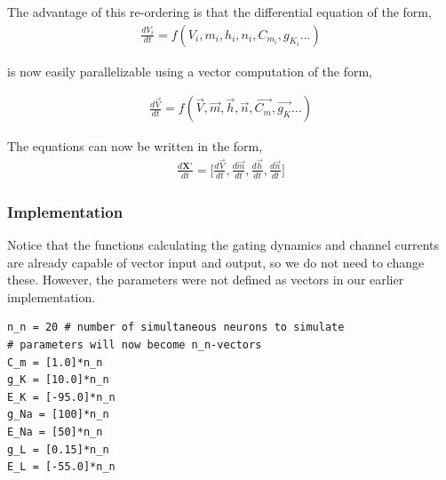\documentclass[10pt,letterpaper]{article}
\begin{document}
\begin{nolinenumbers}
The advantage of this re-ordering is that the differential equation of the form,
\begin{eqnarray}\frac{dV_i}{dt}=f(V_i,m_i,h_i,n_i,C_{m_i},g_{K_i}...)\end{eqnarray}

is now easily parallelizable using a vector computation of the form, 

\begin{eqnarray}\frac{d\vec{V}}{dt}=f(\vec{V},\vec{m},\vec{h},\vec{n},\vec{C_m},\vec{g_K}...)\end{eqnarray}

The equations can now be written in the form,
\begin{eqnarray}\frac{d\mathbf{X'}}{dt}= \Big[\frac{d\vec{V}}{dt},\frac{d\vec{m}}{dt},\frac{d\vec{h}}{dt},\frac{d\vec{n}}{dt}\Big]\end{eqnarray}

\subsubsection*{Implementation}

Notice that the functions calculating the gating dynamics and channel currents are already capable of vector input and output, so we do not need to change these. However, the parameters were not defined as vectors in our earlier implementation.

\begin{verbatim}
n_n = 20 # number of simultaneous neurons to simulate
# parameters will now become n_n-vectors
C_m = [1.0]*n_n
g_K = [10.0]*n_n
E_K = [-95.0]*n_n
g_Na = [100]*n_n
E_Na = [50]*n_n 
g_L = [0.15]*n_n
E_L = [-55.0]*n_n


\end{verbatim}
\end{nolinenumbers}
\end{document}
